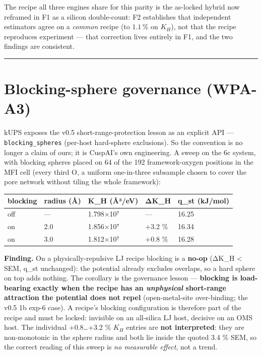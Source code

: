 The recipe all three engines share for this parity is the as-locked
hybrid now reframed in F1 as a silicon double-count: F2 establishes that
independent estimators agree on a \emph{common} recipe (to \(1.1\,\%\) on
\(K_H\)), not that the recipe reproduces experiment --- that correction
lives entirely in F1, and the two findings are consistent.

\begin{center}\rule{0.5\linewidth}{0.5pt}\end{center}

\section{Blocking-sphere governance
(WPA-A3)}\label{blocking-sphere-governance-wpa-a3}

kUPS exposes the v0.5 short-range-protection lesson as an explicit API
--- \texttt{blocking\_spheres} (per-host hard-sphere exclusions). So the
convention is no longer a claim of ours; it is CuspAI's own engineering.
A sweep on the 6c system, with blocking spheres placed on 64 of the
192 framework-oxygen positions in the MFI cell (every third O, a
uniform one-in-three subsample chosen to cover the pore network without
tiling the whole framework):

{%
\begin{longtable}[]{@{}lllll@{}}
\toprule\noalign{}
blocking & radius (Å) & K\_H (Å³/eV) & ΔK\_H & q\_st (kJ/mol) \\
\midrule\noalign{}
\endhead
\bottomrule\noalign{}
\endlastfoot
off & --- & 1.798×10⁷ & --- & 16.25 \\
on & 2.0 & 1.856×10⁷ & +3.2 \% & 16.34 \\
on & 3.0 & 1.812×10⁷ & +0.8 \% & 16.28 \\
\end{longtable}
}

\textbf{Finding.} On a physically-repulsive LJ recipe blocking is a
\textbf{no-op} (ΔK\_H \textless{} SEM, q\_st unchanged): the potential
already excludes overlaps, so a hard sphere on top adds nothing. The
corollary is the governance lesson --- \textbf{blocking is load-bearing
exactly when the recipe has an \emph{unphysical} short-range attraction
the potential does not repel} (open-metal-site over-binding; the v0.5 1b
exp-6 case). A recipe's blocking configuration is therefore part of the
recipe and must be locked: invisible on an all-silica LJ host, decisive
on an OMS host. The individual +0.8\ldots+3.2 \% \(K_H\) entries are
\textbf{not interpreted}: they are non-monotonic in the sphere radius
and both lie inside the quoted 3.4 \% SEM, so the correct reading of
this sweep is \emph{no measurable effect}, not a trend.

